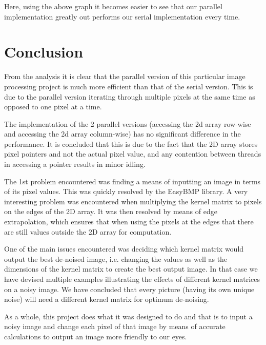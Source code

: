 \documentclass[paper=a4, fontsize=11pt]{scrartcl} %
\numberwithin{equation}{section} %
\numberwithin{figure}{section} %
\numberwithin{table}{section} %
\begin{document}
Here, using the above graph it becomes easier to see that our parallel implementation greatly out performs our serial implementation every time.
\section{Conclusion}
From the analysis it is clear that the parallel version of this particular image processing project is much more efficient than that of the serial version. This is due to the parallel version iterating through multiple pixels at the same time as opposed to one pixel at a time.


The implementation of the 2 parallel versions (accessing the 2d array row-wise and accessing the 2d array column-wise) has no significant difference in the performance. It is concluded that this is due to the fact that the 2D array stores pixel pointers and not the actual pixel value, and any contention between threads in accessing a pointer results in minor idling.


The 1st problem encountered was finding a means of inputting an image in terms of its pixel values. This was quickly resolved by the EasyBMP library.
A very interesting problem was encountered when multiplying the kernel matrix to pixels on the edges of the 2D array. It was then resolved by means of edge extrapolation, which ensures that when using the pixels at the edges that there are still values outside the 2D array for computation.


One of the main issues encountered was deciding which kernel matrix would output the best de-noised image, i.e. changing the values as well as the dimensions of the kernel matrix to create the best output image. In that case we have devised multiple examples illustrating the effects of different kernel matrices on a noisy image. We have concluded that every picture (having its own unique noise) will need a different kernel matrix for optimum de-noising.


As a whole, this project does what it was designed to do and that is to input a noisy image and change each pixel of that image by means of accurate calculations to output an image more friendly to our eyes.
\end{document}
